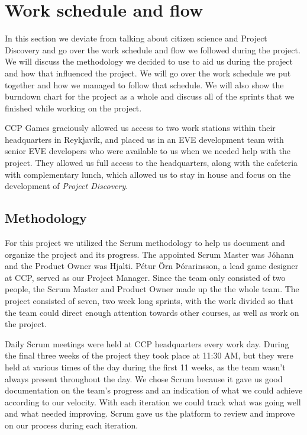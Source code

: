 \section{Work schedule and flow}\label{sec:workscheduleandflow}

In this section we deviate from talking about citizen science and Project Discovery and go over the work schedule and flow we followed during the project. We will discuss the methodology we decided to use to aid us during the project and how that influenced the project. We will go over the work schedule we put together and how we managed to follow that schedule. We will also show the burndown chart for the project as a whole and discuss all of the sprints that we finished while working on the project.

CCP Games graciously allowed us access to two work stations within their headquarters in Reykjavík, and placed us in an EVE development team with senior EVE developers who were available to us when we needed help with the project. They allowed us full access to the headquarters, along with the cafeteria with complementary lunch, which allowed us to stay in house and focus on the development of \emph{Project Discovery}.

\subsection{Methodology}
	For this project we utilized the Scrum methodology to help us document and organize the project and its progress. The appointed Scrum Master was Jóhann and the Product Owner was Hjalti. Pétur Örn Þórarinsson, a lead game designer at CCP, served as our Project Manager. Since the team only consisted of two people, the Scrum Master and Product Owner made up the the whole team. The project consisted of seven, two week long sprints, with the work divided so that the team could direct enough attention towards other courses, as well as work on the project.

	Daily Scrum meetings were held at CCP headquarters every work day. During the final three weeks of the project they took place at 11:30 AM, but they were held at various times of the day during the first 11 weeks, as the team wasn't always present throughout the day. We chose Scrum because it gave us good documentation on the team's progress and an indication of what we could achieve according to our velocity. With each iteration we could track what was going well and what needed improving. Scrum gave us the platform to review and improve on our process during each iteration.

